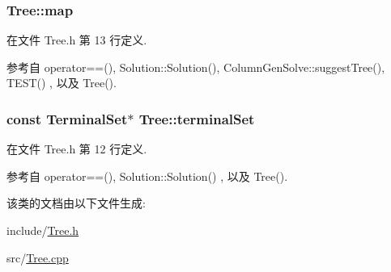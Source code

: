 \subsubsection[{\texorpdfstring{map}{map}}]{ Tree\+::map}\hypertarget{classTree_a1e3b10da468444e998120389f271d6b1}{}\label{classTree_a1e3b10da468444e998120389f271d6b1}


在文件 Tree.\+h 第 13 行定义.



参考自 operator==(), Solution\+::\+Solution(), Column\+Gen\+Solve\+::suggest\+Tree(), T\+E\+S\+T() , 以及 Tree().

\subsubsection[{\texorpdfstring{terminal\+Set}{terminalSet}}]{\setlength{\rightskip}{0pt plus 5cm}const {\bf Terminal\+Set}$\ast$ Tree\+::terminal\+Set}\hypertarget{classTree_a83a3dcb8167164b3086d1f52c5b7b3eb}{}\label{classTree_a83a3dcb8167164b3086d1f52c5b7b3eb}


在文件 Tree.\+h 第 12 行定义.



参考自 operator==(), Solution\+::\+Solution() , 以及 Tree().



该类的文档由以下文件生成\+:\begin{DoxyCompactItemize}
\item 
include/\hyperlink{Tree_8h}{Tree.\+h}\item 
src/\hyperlink{Tree_8cpp}{Tree.\+cpp}\end{DoxyCompactItemize}
